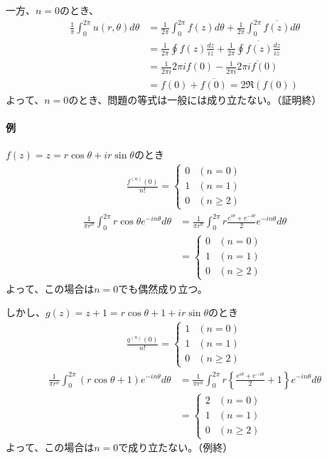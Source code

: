 一方、$n=0$のとき、
\begin{align*}
    \frac{1}{\pi}\int_{0}^{2\pi}u(r,\theta)d\theta
    &=\frac{1}{2\pi}\int_{0}^{2\pi}f(z)d\theta
     +\frac{1}{2\pi}\int_{0}^{2\pi}\overline{f(z)}d\theta\\
    &=\frac{1}{2\pi}\oint f(z)\frac{dz}{iz}
    +\frac{1}{2\pi}\overline{\oint f(z)\frac{dz}{iz}}\\
    &=\frac{1}{2\pi i}2\pi if(0)-\frac{1}{2\pi i}\overline{2\pi if(0)}\\
    &=f(0)+\overline{f(0)}=2\Re(f(0))
\end{align*}
よって、$n=0$のとき、問題の等式は一般には成り立たない。（証明終）

\paragraph{例}
$f(z)=z=r\cos\theta+ir\sin\theta$のとき
\begin{align*}
    \frac{f^{(n)}(0)}{n!}=
    \begin{cases}
        0 & (n=0)\\
        1 & (n=1)\\
        0 & (n\ge2)
    \end{cases}
\end{align*}
\begin{align*}
    \frac{1}{\pi r^n}\int_{0}^{2\pi}r\cos\theta e^{-in\theta}d\theta
    &=\frac{1}{\pi r^n}\int_{0}^{2\pi}r\frac{e^{i\theta}+e^{-i\theta}}{2} e^{-in\theta}d\theta\\
    &=\begin{cases}
        0 & (n=0)\\
        1 & (n=1)\\
        0 & (n\ge2)
    \end{cases}
\end{align*}
よって、この場合は$n=0$でも偶然成り立つ。

しかし、$g(z)=z+1=r\cos\theta+1+ir\sin\theta$のとき
\begin{align*}
    \frac{g^{(n)}(0)}{n!}=
    \begin{cases}
        1 & (n=0)\\
        1 & (n=1)\\
        0 & (n\ge2)
    \end{cases}
\end{align*}
\begin{align*}
    \frac{1}{\pi r^n}\int_{0}^{2\pi}(r\cos\theta+1) e^{-in\theta}d\theta
    &=\frac{1}{\pi r^n}\int_{0}^{2\pi}r\left\{\frac{e^{i\theta}+e^{-i\theta}}{2}+1\right\} e^{-in\theta}d\theta\\
    &=\begin{cases}
        2 & (n=0)\\
        1 & (n=1)\\
        0 & (n\ge2)
    \end{cases}
\end{align*}
よって、この場合は$n=0$で成り立たない。（例終）

